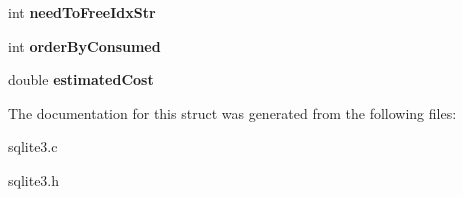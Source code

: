 \begin{DoxyCompactItemize}
\item 
\hypertarget{structsqlite3__index__info_a5410066c067c3891cdf165c70cc4d6b1}{int {\bfseries need\-To\-Free\-Idx\-Str}}\label{structsqlite3__index__info_a5410066c067c3891cdf165c70cc4d6b1}

\item 
\hypertarget{structsqlite3__index__info_a5515d9de0f37f68d7e0930c20a668b29}{int {\bfseries order\-By\-Consumed}}\label{structsqlite3__index__info_a5515d9de0f37f68d7e0930c20a668b29}

\item 
\hypertarget{structsqlite3__index__info_aa8b4fe1d2ee38aab57ba5e1da00d7830}{double {\bfseries estimated\-Cost}}\label{structsqlite3__index__info_aa8b4fe1d2ee38aab57ba5e1da00d7830}

\end{DoxyCompactItemize}


The documentation for this struct was generated from the following files\-:\begin{DoxyCompactItemize}
\item 
sqlite3.\-c\item 
sqlite3.\-h\end{DoxyCompactItemize}
